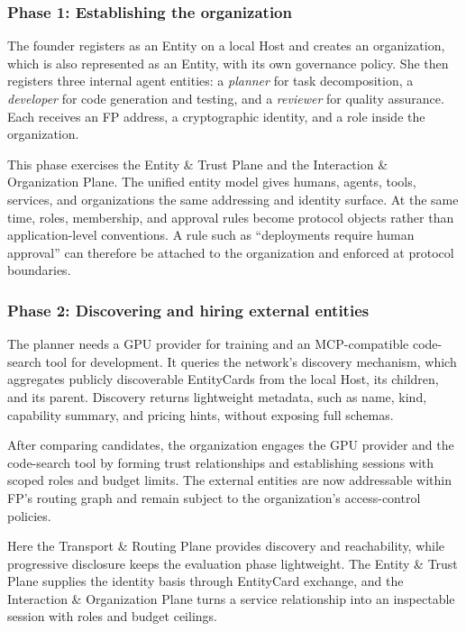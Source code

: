 \documentclass{llmxive}
\begin{document}
\subsubsection{Phase 1: Establishing the organization}

The founder registers as an Entity on a local Host and creates an organization, which is also represented as an Entity, with its own governance policy. She then registers three internal agent entities: a \emph{planner} for task decomposition, a \emph{developer} for code generation and testing, and a \emph{reviewer} for quality assurance. Each receives an FP address, a cryptographic identity, and a role inside the organization.

This phase exercises the Entity \& Trust Plane and the Interaction \& Organization Plane. The unified entity model gives humans, agents, tools, services, and organizations the same addressing and identity surface. At the same time, roles, membership, and approval rules become protocol objects rather than application-level conventions. A rule such as ``deployments require human approval'' can therefore be attached to the organization and enforced at protocol boundaries.

\subsubsection{Phase 2: Discovering and hiring external entities}

The planner needs a GPU provider for training and an MCP-compatible code-search tool for development. It queries the network's discovery mechanism, which aggregates publicly discoverable EntityCards from the local Host, its children, and its parent. Discovery returns lightweight metadata, such as name, kind, capability summary, and pricing hints, without exposing full schemas.

After comparing candidates, the organization engages the GPU provider and the code-search tool by forming trust relationships and establishing sessions with scoped roles and budget limits. The external entities are now addressable within FP's routing graph and remain subject to the organization's access-control policies.

Here the Transport \& Routing Plane provides discovery and reachability, while progressive disclosure keeps the evaluation phase lightweight. The Entity \& Trust Plane supplies the identity basis through EntityCard exchange, and the Interaction \& Organization Plane turns a service relationship into an inspectable session with roles and budget ceilings.
\end{document}
